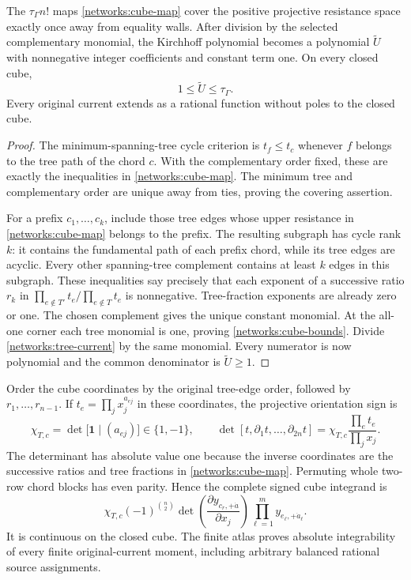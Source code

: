 \begin{proposition}
\label{networks:atlas}
The $\tau_\Gamma n!$ maps \eqref{networks:cube-map} cover the positive
projective resistance space exactly once away from equality walls.
After division by the selected complementary monomial, the Kirchhoff
polynomial becomes a polynomial $\widetilde U$ with nonnegative integer
coefficients and constant term one.  On every closed cube,
\begin{equation}
              1\le\widetilde U\le\tau_\Gamma.
 \label{networks:cube-bounds}
\end{equation}
Every original current extends as a rational function without poles to
the closed cube.
\end{proposition}
\begin{proof}
The minimum-spanning-tree cycle criterion is
$t_f\le t_c$ whenever $f$ belongs to the tree path of the chord $c$.
With the complementary order fixed, these are exactly the inequalities
in \eqref{networks:cube-map}.  The minimum tree and complementary order
are unique away from ties, proving the covering assertion.

For a prefix $c_1,\ldots,c_k$, include those tree edges whose upper
resistance in \eqref{networks:cube-map} belongs to the prefix.  The
resulting subgraph has cycle rank $k$: it contains the fundamental path
of each prefix chord, while its tree edges are acyclic.  Every other
spanning-tree complement contains at least $k$ edges in this subgraph.
These inequalities say precisely that each exponent of a successive
ratio $r_k$ in
$\prod_{e\notin T'}t_e/\prod_{e\notin T}t_e$ is nonnegative.
Tree-fraction exponents are already zero or one.  The chosen complement
gives the unique constant monomial.  At the all-one corner each tree
monomial is one, proving \eqref{networks:cube-bounds}.
Divide \eqref{networks:tree-current} by the same monomial.  Every numerator
is now polynomial and the common denominator is $\widetilde U\ge1$.
\end{proof}

Order the cube coordinates by the original tree-edge order, followed by
$r_1,\ldots,r_{n-1}$.  If $t_e=\prod_jx_j^{a_{ej}}$ in these coordinates,
the projective orientation sign is
\begin{equation}
 \chi_{T,c}=\det\bigl[\mathbf1\mid(a_{ej})\bigr]\in\{1,-1\},\qquad
 \det[t,\partial_1t,\ldots,\partial_{2n}t]
       =\chi_{T,c}\frac{\prod_e t_e}{\prod_jx_j}.
 \label{networks:cube-sign}
\end{equation}
The determinant has absolute value one because the inverse coordinates
are the successive ratios and tree fractions in
\eqref{networks:cube-map}.  Permuting whole two-row chord blocks has even
parity.  Hence the complete signed cube integrand is
\begin{equation}
 \chi_{T,c}(-1)^{\binom n2}
 \det\left(\frac{\partial y_{c_r,+\dot a}}{\partial x_j}\right)
 \prod_{\ell=1}^m y_{e_\ell,+\dot a_\ell}.
 \label{networks:cube-integrand}
\end{equation}
It is continuous on the closed cube.  The finite atlas proves absolute
integrability of every finite original-current moment, including arbitrary
balanced rational source assignments.

